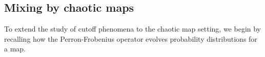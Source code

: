 \documentclass[final]{siamltex}
\begin{document}

\subsection{Mixing by chaotic maps}
To extend the study of cutoff phenomena to the chaotic map setting, we
begin by recalling how the Perron-Frobenius operator evolves
probability distributions for a map.
\end{document}
